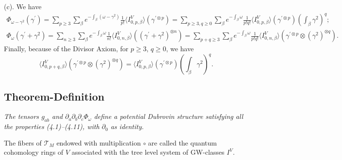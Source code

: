 \documentclass[reqno]{amsart}
\theoremstyle{definition}
\begin{document}
(c). We have
\begin{gather*}
  \Phi_{\omega -\gamma^2}(\gamma^{\prime})=\sum_{p\ge 3}\sum_{\beta}
  e^{-\int_{\beta}(\omega - \gamma^2) }\frac{1}{p!}
  \langle I^V_{0,p,\beta}\rangle (\gamma^{\prime\otimes p}) =
  \sum_{p\ge 3,q\ge 0}\sum_{\beta}e^{-\int_{\beta}\omega }
  \frac{1}{p!q!}\langle I^V_{0,p,\beta}\rangle
  (\gamma^{\prime\otimes p})(\int_{\beta}\gamma^2)^q;
  \\
  \Phi_{\omega}(\gamma^{\prime}+\gamma^2)=\sum_{n\ge 3}\sum_{\beta}
  e^{-\int_{\beta}\omega }\frac{1}{n!}\langle I^V_{0,n,\beta}\rangle
  ((\gamma^{\prime}+\gamma^2)^{\otimes n})=
  \sum_{p+q\ge 3}\sum_{\beta}e^{-\int_{\beta}\omega }\frac{1}{p!q!}
  \langle I^V_{0,n,\beta}\rangle (\gamma^{\prime\otimes p}\otimes
  (\gamma^2)^{\otimes q}).
\end{gather*}
Finally, because of the Divisor Axiom, for $p \ge 3$, $q\ge 0$,
we have
\[
  \langle I^V_{0,p+q,\beta}\rangle (\gamma^{\prime \otimes p}\otimes
  (\gamma^2)^{\otimes q})=
  \langle I^V_{0,p,\beta}\rangle (\gamma^{\prime \otimes p})
  (\int_{\beta}\gamma^2)^q.
\]

\medskip

\subsection{Theorem-Definition}
{
  \it
  The tensors $g_{ab}$ and
  $\partial_a\partial_b\partial_c\Phi_{\omega}$ define a potential
  Dubrovin structure satisfying all the properties (4.1)--(4.11),
  with $\partial_0$ as identity.

  The fibers of $\mathcal{T}_M$ endowed with multiplication $\circ$
  are called the quantum cohomology rings of $V$ associated
  with the tree level system of GW-classes $I^V$.
}

\smallskip
\end{document}
